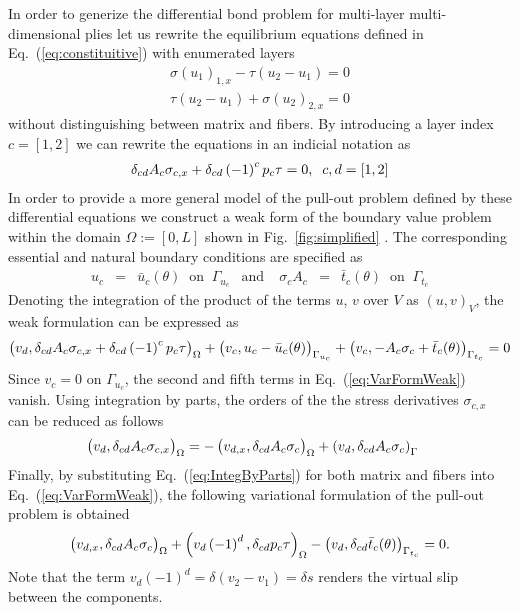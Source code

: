 \documentclass[main.tex]{subfiles}
\begin{document}
In order to generize the differential bond problem for multi-layer multi-dimensional plies let us rewrite the equilibrium equations defined in Eq.~(\ref{eq:constituitive}) with enumerated layers
\begin{align}
\nonumber
 \sigma(u_1)_{1,x} - \tau(u_2-u_1) = 0 \\
 \tau(u_2-u_1) + \sigma(u_2)_{2,x} = 0
\end{align}
without distinguishing between matrix and fibers. By introducing a layer index $c = [1,2]$ we can rewrite the equations in an indicial notation as
\begin{align}
\label{eq:strong_diff_form_indicial}
\delta_{cd} A_c \sigma_{c,x} + \delta_{cd} \left(-1\right)^{c} p_c \tau = 0, \;\; c,d = [1,2]
\end{align}
In order to provide a more general model of the pull-out problem defined by these differential equations we construct a weak form of the boundary value problem within the 
domain  $\Omega := [0,L]$ shown in Fig.~\ref{fig:simplified} . The corresponding essential and natural boundary conditions are specified as
 \begin{equation}\label{eq:BC_discrete_1D}
 \begin{array}{rclcrcl}
 u_c &=& \bar{u}_c(\theta) \;\; \mathrm{on} \;\; \Gamma_{u_c}  &
 \mathrm{and} & \;
 \sigma_c A_c &=& \bar{t}_c(\theta) \;\; \mathrm{on} \;\;
 \Gamma_{t_c} 
 \end{array}
 \end{equation} Denoting the integration of the product of the terms $u$, $v$ over $V$ as $\left( u , v \right)_V$, the weak formulation can be expressed as
\begin{align}
\label{eq:VarFormWeak}
 \left( v_d, \delta_{cd} A_c \sigma_{c,x} + \delta_{cd} \left(-1\right)^{c} p_c \tau \right)_\Omega +
\left( v_c, u_c- \bar{u}_c(\theta) \right)_{\Gamma_{{u_c}}}  +
\left( v_c, -A_c \sigma_{c} + \bar{t}_c(\theta) \right)_{\Gamma_{{t_c}}}
 =  0
\end{align}
Since $v_c=0$ on $ \Gamma_{u_c} $, the second and fifth terms in Eq.~(\ref{eq:VarFormWeak}) vanish. Using integration by parts, the orders of the the stress derivatives $\sigma_{c,x}$ can be reduced as follows
\begin{align}
\label{eq:IntegByParts}
\left(  v_{d} ,  \delta_{cd} A_{c} \sigma_{{c},x}  \right)_\Omega
& =  
-
\left(  v_{{d},x} ,  \delta_{cd} A_{c} \sigma_{c}  \right)_\Omega
+
\left(  v_{d} ,  \delta_{cd} A_{c} \sigma_{c}   \right)_{\Gamma_{{}}}
\end{align}
Finally, by substituting Eq.~(\ref{eq:IntegByParts}) for both matrix and fibers into Eq.~(\ref{eq:VarFormWeak}), the following variational formulation of the pull-out problem is obtained
\begin{align}
\label{eq:variational_form}
\left( v_{d,x}, \delta_{cd} A_c{\sigma}_{c}  \right)_\Omega
+ 
\left( v_{d} \left(-1\right)^{d}, \delta_{cd} p_c \tau \right)_\Omega
 - 
\left( v_{d},  \delta_{cd} \bar{t}_{c}(\theta) \right)_{\Gamma_{{t_{c}}}}
 =  0.
\end{align}
Note that the term $v_d (-1)^d = \delta (v_2 - v_1) = \delta s$ renders the virtual slip between the components. 
\end{document}
